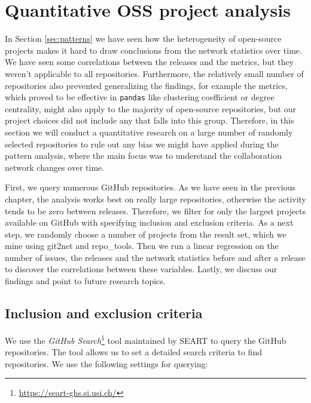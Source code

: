 
\section{Quantitative OSS project analysis}
\label{sec:quantitative}

In Section \ref{sec:patterns} we have seen how the heterogeneity of open-source projects makes it hard to draw conclusions from the network statistics over time. We have seen some correlations between the releases and the metrics, but they weren't applicable to all repositories. Furthermore, the relatively small number of repositories also prevented generalizing the findings, for example the metrics, which proved to be effective in \texttt{pandas} like clustering coefficient or degree centrality, might also apply to the majority of open-source repositories, but our project choices did not include any that falls into this group. Therefore, in this section we will conduct a quantitative research on a large number of randomly selected repositories to rule out any bias we might have applied during the pattern analysis, where the main focus was to understand the collaboration network changes over time.

First, we query numerous GitHub repositories. As we have seen in the previous chapter, the analysis works best on really large repositories, otherwise the activity tends to be zero between releases. Therefore, we filter for only the largest projects available on GitHub with specifying inclusion and exclusion criteria. As a next step, we randomly choose a number of projects from the result set, which we mine using git2net and repo\_tools. Then we run a linear regression on the number of issues, the releases and the network statistics before and after a release to discover the correlations between these variables. Lastly, we discuss our findings and point to future research topics.

\subsection{Inclusion and exclusion criteria}

We use the \textit{GitHub Search}\footnote{\url{https://seart-ghs.si.usi.ch/}} tool maintained by SEART to query the GitHub repositories. The tool allows us to set a detailed search criteria to find repositories. We use the following settings for querying:

